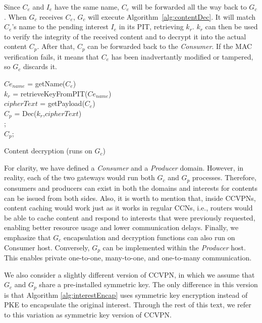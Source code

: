 Since $C_e$ and $I_e$ have the same name, $C_e$ will be forwarded all the way back to $G_c$.
When $G_c$ receives $C_e$, $G_c$ will execute Algorithm~\ref{alg:contentDec}. It will match
$C_e$'s name to the pending interest $I_e$ in its PIT, retrieving $k_r$. $k_r$ can then be
used to verify the integrity of the received content and to decrypt it into the actual
content $C_p$. After that, $C_p$ can be forwarded back to the \textit{Consumer}. If the MAC
verification fails, it means that $C_e$ has been inadvertantly modified or tampered,
so $G_c$ discards it.

\begin{algorithm}\label{alg:contentDec}
$Ce_{name}$ = getName($C_e$)\\
$k_r$ = retrieveKeyFromPIT($Ce_{name}$)\\
$cipherText$ = getPayload($C_e$)\\
$C_p$ = Dec($k_r$,$cipherText$)\\
    {
    \Return ;\\
    }
    {\Return $C_p$;\\}
\caption{Content decryption (runs on $G_c$)}
\end{algorithm}

For clarity, we have defined a \textit{Consumer} and a \textit{Producer} domain. However,
in reality, each of the two gateways would run both $G_c$ and $G_p$ processes. Therefore,
consumers and producers can exist in both the domains and interests for contents can be
issued from both sides. Also, it is worth to mention that, inside CCVPNs, content caching
would work just as it works in regular CCNs, i.e., routers would be able to cache content
and respond to interests that were previously requested, enabling better resource usage and
lower communication delays. Finally, we emphasize that $G_c$ encapsulation and decryption
functions can also run on Consumer host. Conversely, $G_p$ can be implemented within
the \textit{Producer} host. This enables private one-to-one, many-to-one, and one-to-many communication.

We also consider a slightly different version of CCVPN, in which we assume that $G_c$ and $G_p$
share a pre-installed symmetric key. The only difference in this version is that
Algorithm \ref{alg:interestEncap} uses symmetric key encryption instead of PKE to encapsulate
the original interest. Through the rest of this text, we refer to this variation as symmetric
key version of CCVPN.
